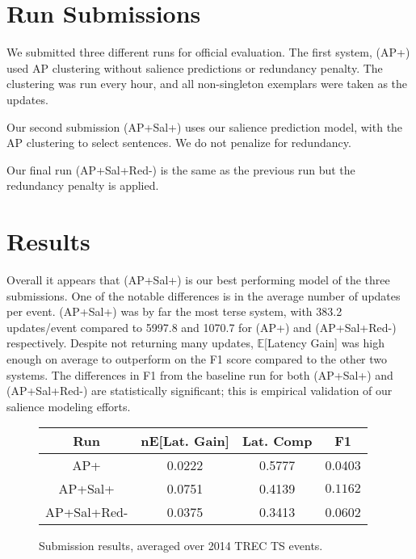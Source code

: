 \documentclass{sig-alternate}
\begin{document}















\section{Run Submissions}

We submitted three different runs for official evaluation. The first system,
(AP+) used AP clustering without salience predictions or redundancy penalty.
The clustering was run every hour, and all non-singleton exemplars were 
taken as the updates.

Our second submission (AP+Sal+) uses our salience prediction model, with the
AP clustering to select sentences. We do not penalize for redundancy.

Our final run (AP+Sal+Red-) is the same as the previous run but the 
redundancy penalty is applied.

\section{Results}

Overall it appears that (AP+Sal+) is our best performing model of the three
submissions. One of the notable differences is in the average number of 
updates per event. (AP+Sal+) was by far the most terse system, with 
383.2 updates/event compared to 5997.8 and 1070.7 for (AP+) and (AP+Sal+Red-)
respectively.
Despite not returning many updates, $\mathbb{E}$[Latency Gain] was high enough
on average to outperform on the F1 score compared to the other two systems.
The differences in F1 from the baseline run for both (AP+Sal+) and 
(AP+Sal+Red-) are statistically significant; 
this is empirical validation of our salience modeling efforts.

\begin{figure}
\centering
\begin{tabular}{| c | c | c | c |}
\hline
\textbf{Run} & \textbf{nE[Lat. Gain]} & \textbf{Lat. Comp} & \textbf{F1} \\
\hline
AP+ & 0.0222  & 0.5777 & 0.0403\\
\hline
AP+Sal+ & 0.0751 &  0.4139 & $\mathbf{0.1162}$\\
\hline
AP+Sal+Red- & 0.0375 & 0.3413 & 0.0602\\
\hline
\end{tabular}
\caption{Submission results, averaged over 2014 TREC TS events.}
\end{figure}
\end{document}
